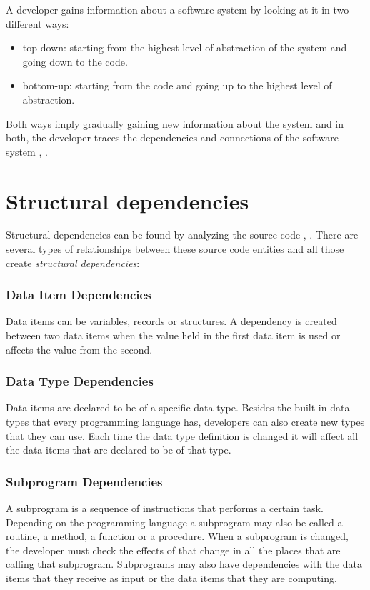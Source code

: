 \documentclass[12pt]{mitthesis}
\begin{document}
A developer gains information about a software system by looking at it in two different ways: 
\begin{itemize}
	\item top-down: starting from the highest level of abstraction of the system and going down to the code.
	\item bottom-up: starting from the code and going up to the highest level of abstraction.
\end{itemize}

Both ways imply gradually gaining new information about the system and in both, the developer traces the dependencies and connections of the software system \cite{Wilde90understandingprogram}, \cite{341244}.

\section{Structural dependencies}
Structural dependencies can be found by analyzing the source code \cite{Sangal:2005:UDM:1094811.1094824}, \cite{CalloArias2011}. 
There are several types of relationships between these source code entities and all those create \textit{structural dependencies}:

\subsubsection{Data Item Dependencies}
Data items can be variables, records or structures. A dependency is created between two data items when the value held in the first data item is used or affects the value from the second.

\subsubsection{Data Type Dependencies}
Data items are declared to be of a specific data type. Besides the built-in data types that every programming language has, developers can also create new types that they can use. Each time the data type definition is changed it will affect all the data items that are declared to be of that type. 

\subsubsection{Subprogram Dependencies}
A subprogram is a sequence of instructions that performs a certain task. Depending on the programming language a subprogram may also be called a routine, a method, a function or a procedure. When a subprogram is changed, the developer must check the effects of that change in all the places that are calling that subprogram. Subprograms may also have dependencies with the data items that they receive as input or the data items that they are computing.
\end{document}

